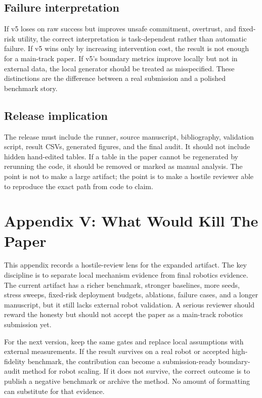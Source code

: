 \documentclass{article}
\begin{document}
\subsection{Failure interpretation}
If v5 loses on raw success but improves unsafe commitment, overtrust, and fixed-risk utility, the correct interpretation is task-dependent rather than automatic failure. If v5 wins only by increasing intervention cost, the result is not enough for a main-track paper. If v5's boundary metrics improve locally but not in external data, the local generator should be treated as misspecified. These distinctions are the difference between a real submission and a polished benchmark story.

\subsection{Release implication}
The release must include the runner, source manuscript, bibliography, validation script, result CSVs, generated figures, and the final audit. It should not include hidden hand-edited tables. If a table in the paper cannot be regenerated by rerunning the code, it should be removed or marked as manual analysis. The point is not to make a large artifact; the point is to make a hostile reviewer able to reproduce the exact path from code to claim.


\section{Appendix V: What Would Kill The Paper}
This appendix records a hostile-review lens for the expanded artifact. The key discipline is to separate local mechanism evidence from final robotics evidence. The current artifact has a richer benchmark, stronger baselines, more seeds, stress sweeps, fixed-risk deployment budgets, ablations, failure cases, and a longer manuscript, but it still lacks external robot validation. A serious reviewer should reward the honesty but should not accept the paper as a main-track robotics submission yet.

For the next version, keep the same gates and replace local assumptions with external measurements. If the result survives on a real robot or accepted high-fidelity benchmark, the contribution can become a submission-ready boundary-audit method for robot scaling. If it does not survive, the correct outcome is to publish a negative benchmark or archive the method. No amount of formatting can substitute for that evidence.
\end{document}
